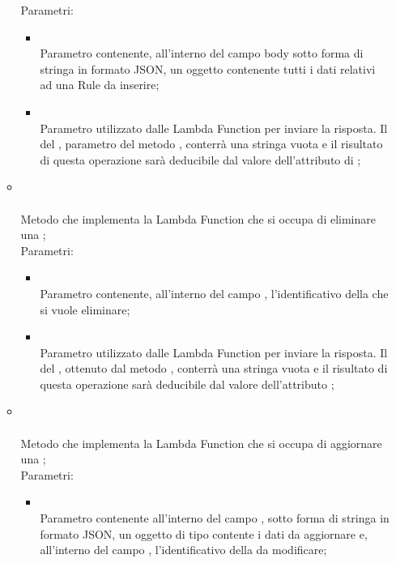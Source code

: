 \begin{itemize}
\begin{itemize}
		Parametri:
		\begin{itemize}
			\item {} \\
			Parametro contenente, all'interno del campo body sotto forma di stringa in formato JSON, un oggetto  contenente tutti i dati relativi ad una Rule da inserire;
			\item {} \\
			Parametro utilizzato dalle Lambda Function per inviare la risposta. Il  del , parametro del metodo , conterrà una stringa vuota e il risultato di questa operazione sarà deducibile dal valore dell'attributo di ;
		\end{itemize}
		\item[] \\ \\		Metodo che implementa la Lambda Function che si occupa di eliminare una ;\\
		Parametri:
		\begin{itemize}
			\item {} \\
			Parametro contenente, all'interno del campo , l'identificativo della  che si vuole eliminare;
			\item {} \\
			Parametro utilizzato dalle Lambda Function per inviare la risposta. Il  del , ottenuto dal metodo , conterrà una stringa vuota e il risultato di questa operazione sarà deducibile dal valore dell'attributo ;
		\end{itemize}
		\item[] \\ \\		Metodo che implementa la Lambda Function che si occupa di aggiornare una ;\\
		Parametri:
		\begin{itemize}
			\item {} \\
			Parametro contenente all'interno del campo , sotto forma di stringa in formato JSON, un oggetto di tipo  contente i dati da aggiornare e, all'interno del campo , l'identificativo della  da modificare;

\end{itemize}
\end{itemize}
\end{itemize}
